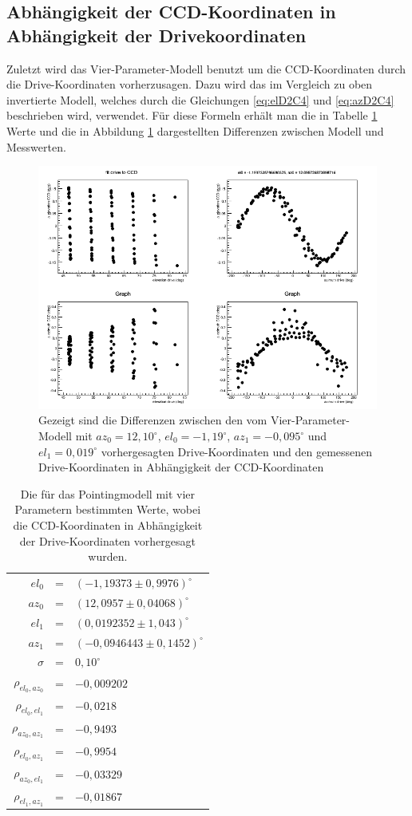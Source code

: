 \subsection{Abhängigkeit der CCD-Koordinaten in Abhängigkeit der Drivekoordinaten}
Zuletzt wird das Vier-Parameter-Modell benutzt um die CCD-Koordinaten durch die Drive-Koordinaten vorherzusagen. Dazu wird das im Vergleich zu oben invertierte Modell, welches durch die Gleichungen \ref{eq:elD2C4} und \ref{eq:azD2C4} beschrieben wird, verwendet. Für diese Formeln erhält man die in Tabelle \ref{tab:D2C4} Werte und die in Abbildung \ref{img:D2C4} dargestellten Differenzen zwischen Modell und Messwerten.
\begin{figure}[htbp]
\centering
\includegraphics[width=\textwidth]{../341/run341D2C4.png}
\caption{Gezeigt sind die Differenzen zwischen den vom Vier-Parameter-Modell mit $az_0=12,10^{\circ}$, $el_0=-1,19^{\circ}$, $az_1=-0,095^{\circ}$ und $el_1=0,019^{\circ}$ vorhergesagten Drive-Koordinaten und den gemessenen Drive-Koordinaten in Abhängigkeit der CCD-Koordinaten}
\label{img:D2C4}
\end{figure}
\begin{table}[htbp]
\centering
\begin{tabular}{rcl}
\toprule
$el_0$ &=& $(-1,19373\pm 0,9976)^{\circ}$\\
$az_0$ &=& $(12,0957\pm0,04068)^{\circ}$\\
$el_1$ &=& $(0,0192352\pm 1,043)^{\circ}$\\
$az_1$ &=& $(-0,0946443\pm0,1452)^{\circ}$\\
$\sigma$ &=& $0,10^{\circ}$\\
$\rho_{el_0,az_0}$&=& $-0,009202$\\
$\rho_{el_0,el_1}$&=& $-0,0218$\\
$\rho_{az_0,az_1}$&=& $-0,9493$\\
$\rho_{el_0,az_1}$&=& $-0,9954$\\
$\rho_{az_0,el_1}$&=& $-0,03329$\\
$\rho_{el_1,az_1}$&=& $-0,01867$\\
\bottomrule
\end{tabular}
\label{tab:D2C4}
\caption{Die für das Pointingmodell mit vier Parametern bestimmten Werte, wobei die CCD-Koordinaten in Abhängigkeit der Drive-Koordinaten vorhergesagt wurden.}
\end{table}

